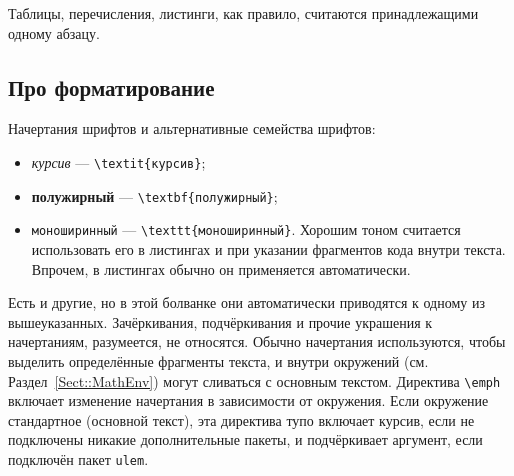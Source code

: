 \documentclass[14pt, russian]{scrartcl}
\begin{document}
Таблицы, перечисления, листинги, как правило, считаются принадлежащими одному абзацу.

\subsection{Про форматирование}\label{sect:formatting}

Начертания шрифтов и альтернативные семейства шрифтов:
\begin{itemize}
\item \textit{курсив} --- \texttt{\textbackslash textit\{курсив\}};
\item \textbf{полужирный} --- \texttt{\textbackslash textbf\{полужирный\}};
\item \texttt{моноширинный} --- \texttt{\textbackslash texttt\{моноширинный\}}. Хорошим тоном считается использовать его в листингах и при указании фрагментов кода внутри текста. Впрочем, в листингах обычно он применяется автоматически.
\end{itemize}

Есть и другие, но в этой болванке они автоматически приводятся к одному из вышеуказанных. Зачёркивания, подчёркивания и прочие украшения к начертаниям, разумеется, не относятся. Обычно начертания используются, чтобы выделить определённые фрагменты текста, и внутри окружений (см. Раздел~\ref{Sect::MathEnv}) могут сливаться с основным текстом. Директива \texttt{\textbackslash emph} включает изменение начертания в зависимости от окружения. Если окружение стандартное (основной текст), эта директива тупо включает курсив, если не подключены никакие дополнительные пакеты, и подчёркивает аргумент, если подключён пакет \texttt{ulem}.
 
\end{document}
